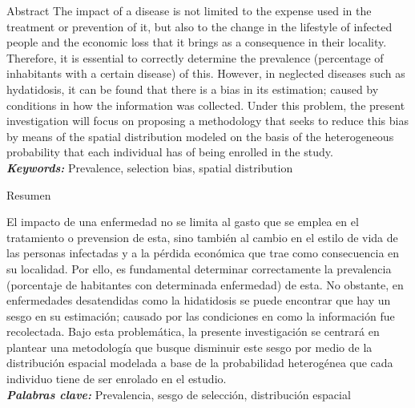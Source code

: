 \begin{poliabstract}{Abstract} 
   The impact of a disease is not limited to the expense used in the treatment or prevention of it, but also to the change in the lifestyle of infected people and the economic loss that it brings as a consequence in their locality. Therefore, it is essential to correctly determine the prevalence (percentage of inhabitants with a certain disease) of this. However, in neglected diseases such as hydatidosis, it can be found that there is a bias in its estimation; caused by conditions in how the information was collected. Under this problem, the present investigation will focus on proposing a methodology that seeks to reduce this bias by means of the spatial distribution modeled on the basis of the heterogeneous probability that each individual has of being enrolled in the study.\\
   
   \textit{\textbf{Keywords:}} Prevalence, selection bias, spatial distribution
   
\end{poliabstract}
 
\begin{poliabstract}{Resumen}
   
   El impacto de una enfermedad no se limita al gasto que se emplea en el tratamiento o prevension de esta, sino también al cambio en el estilo de vida de las personas infectadas y a la pérdida económica que trae como consecuencia en su localidad. Por ello, es fundamental determinar correctamente la prevalencia (porcentaje de habitantes con determinada enfermedad) de esta. No obstante, en enfermedades desatendidas como la hidatidosis se puede encontrar que hay un sesgo en su estimación; causado por las condiciones en como la información fue recolectada. Bajo esta problemática, la presente investigación se centrará en plantear una metodología que busque disminuir este sesgo por medio de la distribución espacial modelada a base de la probabilidad heterogénea que cada individuo tiene de ser enrolado en el estudio.\\
   
   \textit{\textbf{Palabras clave:}} Prevalencia, sesgo de selección, distribución espacial
   
\end{poliabstract}
